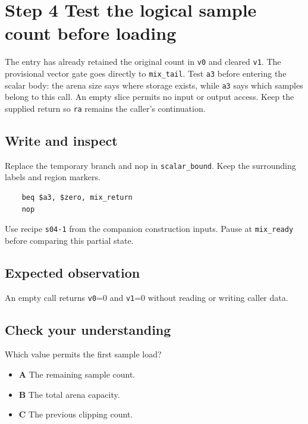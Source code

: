 \section{Step 4 Test the logical sample count before loading}\label{pcm-s04}

The entry has already retained the original count in \texttt{v0} and cleared \texttt{v1}. The provisional vector gate goes directly to \texttt{mix\_tail}. Test \texttt{a3} before entering the scalar body: the arena size says where storage exists, while \texttt{a3} says which samples belong to this call. An empty slice permits no input or output access. Keep the supplied return so \texttt{ra} remains the caller’s continuation.

\subsection{Write and inspect}
Replace the temporary branch and nop in \texttt{scalar\_bound}. Keep the surrounding labels and region markers.

\begin{verbatim}
    beq $a3, $zero, mix_return
    nop
\end{verbatim}
Use recipe \texttt{s04-1} from the companion construction inputs. Pause at \texttt{mix\_ready} before comparing this partial state.

\subsection{Expected observation}
An empty call returns \texttt{v0}=0 and \texttt{v1}=0 without reading or writing caller data.

\subsection{Check your understanding}
Which value permits the first sample load?

\begin{itemize}
\item \textbf{A} The remaining sample count.
\item \textbf{B} The total arena capacity.
\item \textbf{C} The previous clipping count.
\end{itemize}
